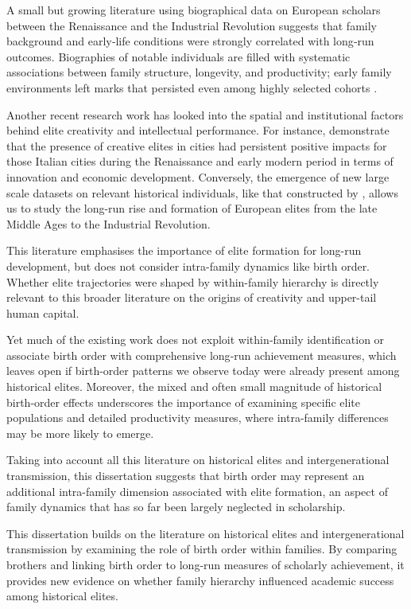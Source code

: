 A small but growing literature using biographical data on European scholars between the Renaissance and the Industrial Revolution suggests that family background and early‑life conditions were strongly correlated with long‑run outcomes. Biographies of notable individuals are filled with systematic associations between family structure, longevity, and productivity; early family environments left marks that persisted even among highly selected cohorts \citep{DeLaCroix2013, DeLaCroixDocquier2024}.

Another recent research work has looked into the spatial and institutional factors behind elite creativity and intellectual performance. For instance, \cite{SerafinelliTabellini2022} demonstrate that the presence of creative elites in cities had persistent positive impacts for those Italian cities during the Renaissance and early modern period in terms of innovation and economic development. Conversely, the emergence of new large scale datasets on relevant historical individuals, like that constructed by \cite{LaouenanEtAl2022}, allows us to study the long-run rise and formation of European elites from the late Middle Ages to the Industrial Revolution.

This literature emphasises the importance of elite formation for long-run development, but does not consider intra-family dynamics like birth order. Whether elite trajectories were shaped by within-family hierarchy is directly relevant to this broader literature on the origins of creativity and upper-tail human capital.

Yet much of the existing work does not exploit within‑family identification or associate birth order with comprehensive long‑run achievement measures, which leaves open if birth-order patterns we observe today were already present among historical elites. Moreover, the mixed and often small magnitude of historical birth-order effects underscores the importance of examining specific elite populations and detailed productivity measures, where intra-family differences may be more likely to emerge.

Taking into account all this literature on historical elites and intergenerational transmission, this dissertation suggests that birth order may represent an additional intra-family dimension associated with elite formation, an aspect of family dynamics that has so far been largely neglected in scholarship.

This dissertation builds on the literature on historical elites and intergenerational transmission by examining the role of birth order within families. By comparing brothers and linking birth order to long-run measures of scholarly achievement, it provides new evidence on whether family hierarchy influenced academic success among historical elites.

